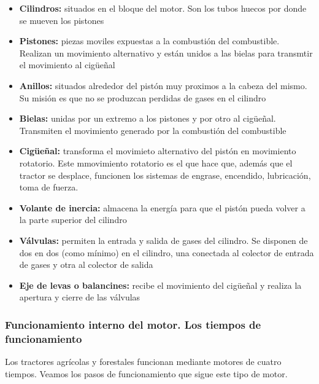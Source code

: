 \documentclass[a4paper,12pt,oneside]{article}
\begin{document}
\begin{itemize}
\item \textbf{Cilindros:} situados en el bloque del motor. Son los tubos huecos por donde
se mueven los pistones
\item \textbf{Pistones:} piezas moviles expuestas a la combustión del combustible. Realizan
un movimiento alternativo y están unidos a  las bielas para transmtir el
movimiento al cigüeñal
\item \textbf{Anillos:} situados alrededor del pistón muy proximos a la cabeza del
mismo. Su misión es que no se produzcan perdidas de gases en el cilindro
\item \textbf{Bielas:} unidas por un extremo a los pistones y por otro al
cigüeñal. Transmiten el movimiento generado por la combustión del combustible
\item \textbf{Cigüeñal:} transforma el movimieto alternativo del pistón en movimiento
rotatorio. Este mmovimiento rotatorio es el que hace que, además que el
tractor se desplace, funcionen los sistemas de engrase, encendido,
lubricación, toma de fuerza.
\item \textbf{Volante de inercia:} almacena la energía para que el pistón pueda volver a la
parte superior del cilindro
\item \textbf{Válvulas:} permiten la entrada y salida de gases del cilindro. Se disponen de
dos en dos (como mínimo) en el cilindro, una conectada al colector de entrada
de gases y otra al colector de salida
\item \textbf{Eje de levas o balancines:} recibe el movimiento del cigüeñal y realiza la
apertura y cierre de las válvulas
\end{itemize}
\subsubsection{Funcionamiento interno del motor. Los tiempos de funcionamiento}
\label{sec:orgfe7ca16}
Los tractores agrícolas y forestales funcionan mediante motores de cuatro
tiempos. Veamos los pasos de funcionamiento que sigue este tipo de motor.
\end{document}

